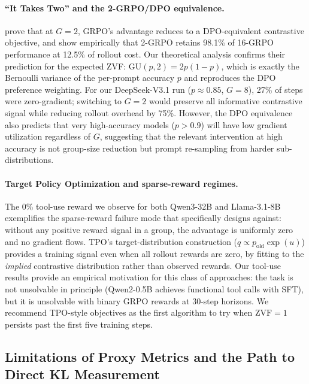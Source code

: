 \documentclass{article}
\begin{document}
\paragraph{``It Takes Two'' and the 2-GRPO/DPO equivalence.}
\citet{wu2025grpo_dpo} prove that at $G = 2$, GRPO's advantage reduces to a
DPO-equivalent contrastive objective, and show empirically that 2-GRPO retains
98.1\% of 16-GRPO performance at 12.5\% of rollout cost.
Our theoretical analysis confirms their prediction for the expected ZVF:
$\mathrm{GU}(p, 2) = 2p(1-p)$, which is exactly the Bernoulli variance of
the per-prompt accuracy $p$ and reproduces the DPO preference weighting.
For our DeepSeek-V3.1 run ($p \approx 0.85$, $G = 8$), 27\% of steps were
zero-gradient; switching to $G = 2$ would preserve all informative contrastive
signal while reducing rollout overhead by 75\%.
However, the DPO equivalence also predicts that very high-accuracy models
($p > 0.9$) will have low gradient utilization regardless of $G$, suggesting
that the relevant intervention at high accuracy is not group-size reduction
but prompt re-sampling from harder sub-distributions.

\paragraph{Target Policy Optimization and sparse-reward regimes.}
The 0\% tool-use reward we observe for both Qwen3-32B and Llama-3.1-8B
exemplifies the sparse-reward failure mode that \citet{kaddour2026tpo}
specifically designs against: without any positive reward signal in a group,
the advantage is uniformly zero and no gradient flows.
TPO's target-distribution construction ($q \propto p_\text{old} \exp(u)$)
provides a training signal even when all rollout rewards are zero, by fitting
to the \emph{implied} contrastive distribution rather than observed rewards.
Our tool-use results provide an empirical motivation for this class of
approaches: the task is not unsolvable in principle (Qwen2-0.5B achieves
functional tool calls with SFT), but it is unsolvable with binary GRPO
rewards at 30-step horizons.
We recommend TPO-style objectives as the first algorithm to try when
$\text{ZVF} = 1$ persists past the first five training steps.

\subsection{Limitations of Proxy Metrics and the Path to Direct KL Measurement}
\label{sec:discuss_kl}
\end{document}
